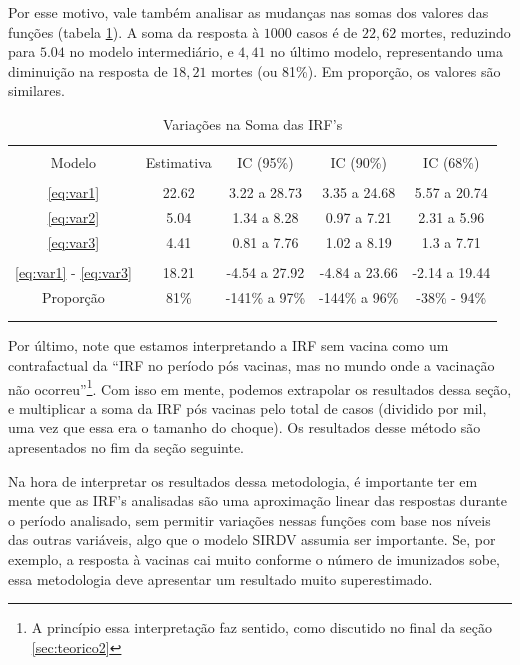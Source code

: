 \documentclass[
	12pt,				%
	oneside,			%
	a4paper,			%
	english,			%
	brazil				%
	hyperref = {colorlinks, citecolor=c1d, linkcolor=c2d, urlcolor=c3d, colorlinks}
	]{abntex2}
\begin{document}
Por esse motivo, vale também analisar as mudanças nas somas dos valores das funções (tabela \ref{tb:irfsoma}). A soma da resposta à $1000$ casos é de $22,62$ mortes, reduzindo para $5.04$ no modelo intermediário, e $4,41$ no último modelo, representando uma diminuição na resposta de $18,21$ mortes (ou 81\%). Em proporção, os valores são similares.

\begin{table}[H]
\centering
\caption{Variações na Soma das IRF's}
\label{tb:irfsoma}
\begin{tabular}{ccccc}
\\[-1.8ex]\hline 
\hline \\[-1.8ex] 
Modelo & Estimativa & IC (95\%) & IC (90\%) & IC (68\%) \\\hline\\[-1.8ex]
\multicolumn{1}{c|}{\eqref{eq:var1}}                    & 22.62 & 3.22 a 28.73 & 3.35 a 24.68 & 5.57 a 20.74 \\ 
\multicolumn{1}{c|}{\eqref{eq:var2}}                    & 5.04 & 1.34  a 8.28 & 0.97  a 7.21 & 2.31  a 5.96 \\ 
\multicolumn{1}{c|}{\eqref{eq:var3}}                    & 4.41 & 0.81  a 7.76 & 1.02  a 8.19 & 1.3   a 7.71 \\ 
\multicolumn{1}{c|}{}                                   &  &  &  &  \\ 
\multicolumn{1}{c|}{\eqref{eq:var1} - \eqref{eq:var3}}  & 18.21 & -4.54 a 27.92 & -4.84 a 23.66 & -2.14 a 19.44 \\ 
\multicolumn{1}{c|}{Proporção}                          & 81\% & -141\% a 97\% & -144\% a 96\% & -38\% - 94\% \\ 
\\[-1.8ex]\hline 
\hline \\[-1.8ex] 
\end{tabular}
\end{table}

Por último, note que estamos interpretando a IRF sem vacina como um contrafactual da ``IRF no período pós vacinas, mas no mundo onde a vacinação não ocorreu''\footnote{A princípio essa interpretação faz sentido, como discutido no final da seção \ref{sec:teorico2}}. Com isso em mente, podemos extrapolar os resultados dessa seção, e multiplicar a soma da IRF pós vacinas pelo total de casos (dividido por mil, uma vez que essa era o tamanho do choque). Os resultados desse método são apresentados no fim da seção seguinte.

Na hora de interpretar os resultados dessa metodologia, é importante ter em mente que as IRF's analisadas são uma aproximação linear das respostas durante o período analisado, sem permitir variações nessas funções com base nos níveis das outras variáveis, algo que o modelo SIRDV assumia ser importante. Se, por exemplo, a resposta à vacinas cai muito conforme o número de imunizados sobe, essa metodologia deve apresentar um resultado muito superestimado.
\end{document}
